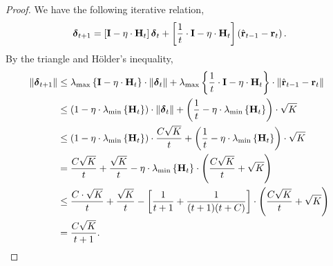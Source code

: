 \documentclass[10pt]{article}
\begin{document}
\begin{proof}
We have the following iterative relation,
\begin{equation*}
\begin{split}
    {\boldsymbol{\delta}}_{t+1} = \left[ {\mathbf{I}} - \eta \cdot {\mathbf{H}}_t \right] {\boldsymbol{\delta}}_t + \left[ \frac{1}{t} \cdot {\mathbf{I}} - \eta \cdot {\mathbf{H}}_t \right] \left( \hat{{\mathbf{r}}}_{t-1} - {\mathbf{r}}_t \right).
\end{split}
\end{equation*}
By the triangle and H{\" o}lder's inequality,
\begin{equation*}
\begin{split}
    \left\| {\boldsymbol{\delta}}_{t+1} \right\| &\le \lambda_{\max}\left\{ {\mathbf{I}} - \eta \cdot {\mathbf{H}}_t \right\} \cdot \left\| {\boldsymbol{\delta}}_{t} \right\| + \lambda_{\max}\left\{ \frac{1}{t} \cdot {\mathbf{I}} - \eta \cdot {\mathbf{H}}_t \right\} \cdot \left\| \hat{{\mathbf{r}}}_{t-1} - {\mathbf{r}}_t \right\| \\
    &\le \left( 1 - \eta \cdot \lambda_{\min}\left\{ {\mathbf{H}}_t \right\} \right) \cdot \left\| {\boldsymbol{\delta}}_{t} \right\| + \left( \frac{1}{t} - \eta \cdot \lambda_{\min}\left\{ {\mathbf{H}}_t \right\} \right) \cdot \sqrt{K} \\
    &\le \left( 1 - \eta \cdot \lambda_{\min}\left\{ {\mathbf{H}}_t \right\} \right) \cdot \frac{C \sqrt{K}}{t} + \left( \frac{1}{t} - \eta \cdot \lambda_{\min}\left\{ {\mathbf{H}}_t \right\} \right) \cdot \sqrt{K} \\
    &= \frac{C \sqrt{K}}{t} + \frac{\sqrt{K}}{t} - \eta \cdot \lambda_{\min}\left\{ {\mathbf{H}}_t \right\} \cdot \left( \frac{C \sqrt{K}}{t} + \sqrt{K} \right) \\
    &\le \frac{C \cdot \sqrt{K}}{t} + \frac{\sqrt{K}}{t} - \left[ \frac{1}{t+1} + \frac{1}{(t+1)(t+C)} \right] \cdot \left( \frac{C \sqrt{K}}{t} + \sqrt{K} \right) \\
    &= \frac{C \sqrt{K}}{t+1}. \qedhere
\end{split}
\end{equation*}
\end{proof}


\begin{equation*}
\begin{split}
    
\end{split}
\end{equation*}
\fi
\end{document}
